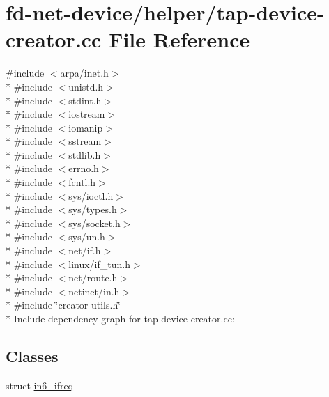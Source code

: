 \hypertarget{tap-device-creator_8cc}{}\section{fd-\/net-\/device/helper/tap-\/device-\/creator.cc File Reference}
\label{tap-device-creator_8cc}
{\ttfamily \#include $<$arpa/inet.\+h$>$}\\*
{\ttfamily \#include $<$unistd.\+h$>$}\\*
{\ttfamily \#include $<$stdint.\+h$>$}\\*
{\ttfamily \#include $<$iostream$>$}\\*
{\ttfamily \#include $<$iomanip$>$}\\*
{\ttfamily \#include $<$sstream$>$}\\*
{\ttfamily \#include $<$stdlib.\+h$>$}\\*
{\ttfamily \#include $<$errno.\+h$>$}\\*
{\ttfamily \#include $<$fcntl.\+h$>$}\\*
{\ttfamily \#include $<$sys/ioctl.\+h$>$}\\*
{\ttfamily \#include $<$sys/types.\+h$>$}\\*
{\ttfamily \#include $<$sys/socket.\+h$>$}\\*
{\ttfamily \#include $<$sys/un.\+h$>$}\\*
{\ttfamily \#include $<$net/if.\+h$>$}\\*
{\ttfamily \#include $<$linux/if\+\_\+tun.\+h$>$}\\*
{\ttfamily \#include $<$net/route.\+h$>$}\\*
{\ttfamily \#include $<$netinet/in.\+h$>$}\\*
{\ttfamily \#include \char`\"{}creator-\/utils.\+h\char`\"{}}\\*
Include dependency graph for tap-\/device-\/creator.cc\+:
\subsection*{Classes}
\begin{DoxyCompactItemize}
\item 
struct \hyperlink{structin6__ifreq}{in6\+\_\+ifreq}
\end{DoxyCompactItemize}
